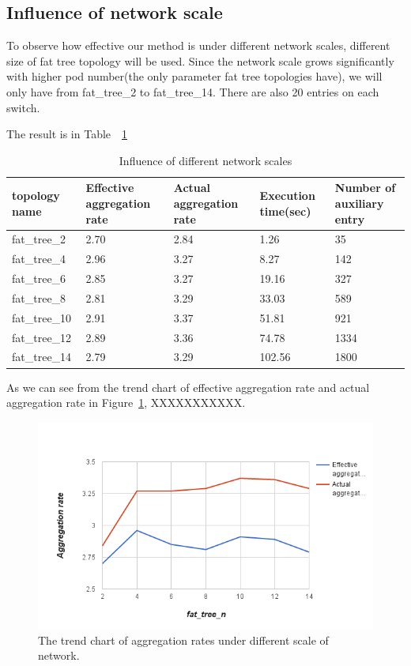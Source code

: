 \subsection{Influence of network scale}
To observe how effective our method is under different network scales, different size of fat tree topology will be used. Since the network scale grows significantly with higher pod number(the only parameter fat tree topologies have), we will only have from fat\_tree\_2 to fat\_tree\_14. There are also 20 entries on each switch.

The result is in Table~~\ref{table:different_scale}

\begin{table}
\centering
\caption{Influence of different network scales}
\begin{tabular}{|l||l|l|l|l|}
\hline topology name & Effective aggregation rate & Actual aggregation rate & Execution time(sec) & Number of auxiliary entry \\
\hline
\hline fat\_tree\_2 & 2.70 & 2.84 & 1.26 & 35 \\
\hline fat\_tree\_4 & 2.96 & 3.27 & 8.27 & 142 \\
\hline fat\_tree\_6 & 2.85 & 3.27 & 19.16 & 327 \\
\hline fat\_tree\_8 & 2.81 & 3.29 & 33.03 & 589 \\
\hline fat\_tree\_10 & 2.91 & 3.37 & 51.81 & 921 \\
\hline fat\_tree\_12 & 2.89 & 3.36 & 74.78 & 1334 \\
\hline fat\_tree\_14 & 2.79 & 3.29 & 102.56 & 1800 \\
\hline
\end{tabular}
\label{table:different_scale}
\end{table}

As we can see from the trend chart of effective aggregation rate and actual aggregation rate in Figure~\ref{different_scale_rate_trend}, XXXXXXXXXXX.

\begin{figure}[H]
\begin{center} 
\includegraphics[width=1\textwidth]{figures/exp_scale_rate_trend.png}
\end{center}
\caption{The trend chart of aggregation rates under different scale of network.}
\label{different_scale_rate_trend}
\end{figure}



